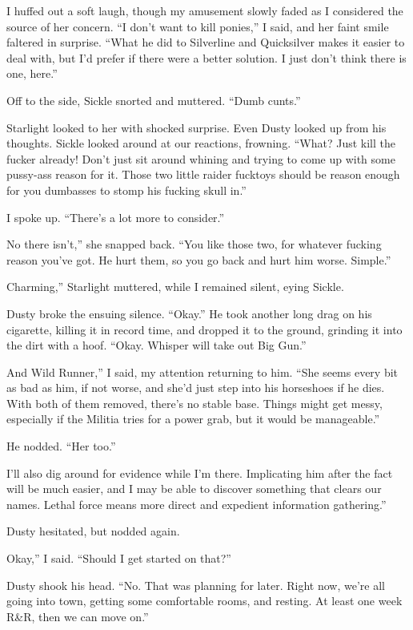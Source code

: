 I huffed out a soft laugh, though my amusement slowly faded as I considered the source of her concern. “I don’t want to kill ponies,” I said, and her faint smile faltered in surprise. “What he did to Silverline and Quicksilver makes it easier to deal with, but I’d prefer if there were a better solution. I just don’t think there is one, here.”

Off to the side, Sickle snorted and muttered. “Dumb cunts.”

Starlight looked to her with shocked surprise. Even Dusty looked up from his thoughts. Sickle looked around at our reactions, frowning. “What? Just kill the fucker already! Don’t just sit around whining and trying to come up with some pussy-ass reason for it. Those two little raider fucktoys should be reason enough for you dumbasses to stomp his fucking skull in.”

I spoke up. “There’s a lot more to consider.”

\leavevmode{}No there isn’t,” she snapped back. “You like those two, for whatever fucking reason you’ve got. He hurt them, so you go back and hurt him worse. Simple.”

\leavevmode{}Charming,” Starlight muttered, while I remained silent, eying Sickle.

Dusty broke the ensuing silence. “Okay.” He took another long drag on his cigarette, killing it in record time, and dropped it to the ground, grinding it into the dirt with a hoof. “Okay. Whisper will take out Big Gun.”

\leavevmode{}And Wild Runner,” I said, my attention returning to him. “She seems every bit as bad as him, if not worse, and she’d just step into his horseshoes if he dies. With both of them removed, there’s no stable base. Things might get messy, especially if the Militia tries for a power grab, but it would be manageable.”

He nodded. “Her too.”

\leavevmode{}I’ll also dig around for evidence while I’m there. Implicating him after the fact will be much easier, and I may be able to discover something that clears our names. Lethal force means more direct and expedient information gathering.”

Dusty hesitated, but nodded again.

\leavevmode{}Okay,” I said. “Should I get started on that?”

Dusty shook his head. “No. That was planning for later. Right now, we’re all going into town, getting some comfortable rooms, and resting. At least one week R\&R, then we can move on.”

